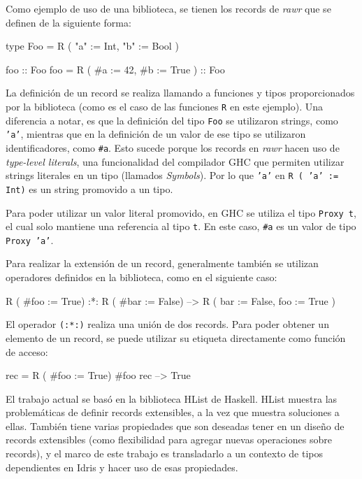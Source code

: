 Como ejemplo de uso de una biblioteca, se tienen los records de \textit{rawr} que se definen de la siguiente forma:

\begin{code}
type Foo = R ( "a" := Int, "b" := Bool )

foo :: Foo
foo = R ( #a := 42, #b := True ) :: Foo
\end{code}

La definición de un record se realiza llamando a funciones y tipos proporcionados por la biblioteca (como es el caso de las funciones \texttt{R} en este ejemplo). Una diferencia a notar, es que la definición del tipo \texttt{Foo} se utilizaron strings, como \texttt{'a'}, mientras que en la definición de un valor de ese tipo se utilizaron identificadores, como \texttt{\#a}. Esto sucede porque los records en \textit{rawr} hacen uso de \textit{type-level literals}, una funcionalidad del compilador GHC que permiten utilizar strings literales en un tipo (llamados \textit{Symbols}). Por lo que \texttt{'a'} en \texttt{R ( 'a' := Int)} es un string promovido a un tipo. 

Para poder utilizar un valor literal promovido, en GHC se utiliza el tipo \texttt{Proxy t}, el cual solo mantiene una referencia al tipo \texttt{t}. En este caso, \texttt{\#a} es un valor de tipo \texttt{Proxy 'a'}.

Para realizar la extensión de un record, generalmente también se utilizan operadores definidos en la biblioteca, como en el siguiente caso:

\begin{code}
R ( #foo := True) :*: R ( #bar := False)
--> R ( bar := False, foo := True )
\end{code}

El operador \texttt{(:*:)} realiza una unión de dos records. Para poder obtener un elemento de un record, se puede utilizar su etiqueta directamente como función de acceso:

\begin{code}
rec = R ( #foo := True)
#foo rec
--> True
\end{code}

El trabajo actual se basó en la biblioteca HList de Haskell. HList muestra las problemáticas de definir records extensibles, a la vez que muestra soluciones a ellas. También tiene varias propiedades que son deseadas tener en un diseño de records extensibles (como flexibilidad para agregar nuevas operaciones sobre records), y el marco de este trabajo es transladarlo a un contexto de tipos dependientes en Idris y hacer uso de esas propiedades.

